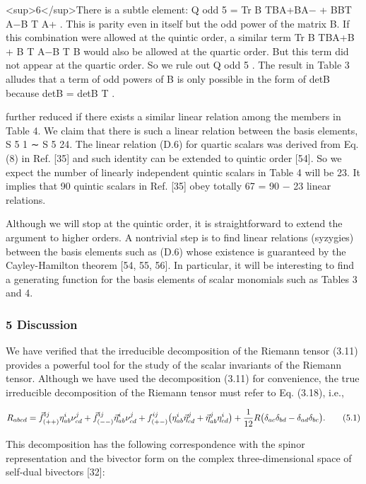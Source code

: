 \documentclass{article}
\begin{document}
<sup>6</sup>There is a subtle element: Q odd 5 = Tr B TBA+BA− + BBT A−B T A+ . This is parity even in itself but the odd power of the matrix B. If this combination were allowed at the quintic order, a similar term Tr B TBA+B + B T A−B T B would also be allowed at the quartic order. But this term did not appear at the quartic order. So we rule out Q odd 5 . The result in Table 3 alludes that a term of odd powers of B is only possible in the form of detB because detB = detB T .

further reduced if there exists a similar linear relation among the members in Table 4. We claim that there is such a linear relation between the basis elements, S 5 1 ∼ S 5 24. The linear relation (D.6) for quartic scalars was derived from Eq. (8) in Ref. [35] and such identity can be extended to quintic order [54]. So we expect the number of linearly independent quintic scalars in Table 4 will be 23. It implies that 90 quintic scalars in Ref. [35] obey totally 67 = 90 − 23 linear relations.

Although we will stop at the quintic order, it is straightforward to extend the argument to higher orders. A nontrivial step is to find linear relations (syzygies) between the basis elements such as (D.6) whose existence is guaranteed by the Cayley-Hamilton theorem [54, 55, 56]. In particular, it will be interesting to find a generating function for the basis elements of scalar monomials such as Tables 3 and 4.

\subsubsection{5 Discussion}

We have verified that the irreducible decomposition of the Riemann tensor (3.11) provides a powerful tool for the study of the scalar invariants of the Riemann tensor. Although we have used the decomposition (3.11) for convenience, the true irreducible decomposition of the Riemann tensor must refer to Eq. (3.18), i.e.,

$$R_{abcd}=\vec{f}^{ij}_{(++)}\eta^{i}_{ab}\nu^{j}_{cd}+\vec{f}^{ij}_{(--)}\vec{\eta}^{i}_{ab}\nu^{j}_{cd}+f^{ij}_{(+-)}\big{(}\eta^{i}_{ab}\vec{\eta}^{j}_{cd}+\vec{\eta}^{j}_{ab}\eta^{i}_{cd}\big{)}+\frac{1}{12}R\big{(}\delta_{ac}\delta_{bd}-\delta_{ad}\delta_{bc}\big{)}.\tag{5.1}$$

This decomposition has the following correspondence with the spinor representation and the bivector form on the complex three-dimensional space of self-dual bivectors [32]:
\end{document}
